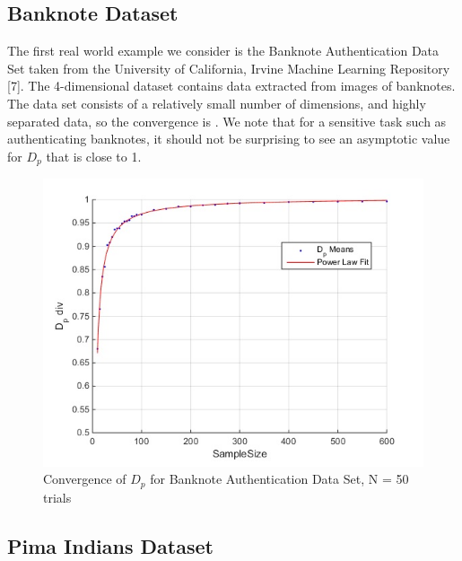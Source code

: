\documentclass{article}
\begin{document}
		\subsection*{\small Banknote Dataset}
		The first real world example we consider is the Banknote Authentication Data Set taken from the University of California, Irvine Machine Learning Repository [7]. The 4-dimensional dataset contains data extracted from images of banknotes. The data set consists of a relatively small number of dimensions, and highly separated data, so the convergence is . We note that for a sensitive task such as authenticating banknotes, it should not be surprising to see an asymptotic value for $D_p$ that is close to 1.  
		\begin{figure}[h!]
			\caption{Convergence of $D_p$ for Banknote Authentication Data Set, N = 50 trials}
			\centering
			\includegraphics[scale=0.6]{dp_n50_banknote}
		\end{figure}
		
		\newpage
		\subsection*{\small Pima Indians Dataset}
		
\end{document}
